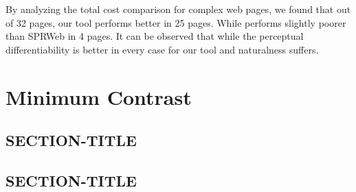 By analyzing the total cost comparison for complex web pages, we found that out of 32 pages, our tool performs better in 25 pages. While performs slightly poorer than SPRWeb in 4 pages. It can be observed that while the perceptual differentiability is better in every case for our tool and naturalness suffers. 

\section{Minimum Contrast}
\label{Minimum Contrast}



\subsection{SECTION-TITLE}
\label{SECTION-LABEL}

\subsection{SECTION-TITLE}
\label{SECTION-LABEL}

